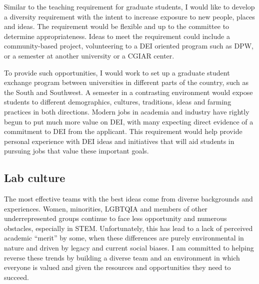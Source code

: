 \documentclass[11pt]{article}
\newcommand{\nicholas}[1]{{\color{nicholasCol} [\textbf{NS:} #1 (\today\ \currenttime)]}}
\begin{document}
Similar to the teaching requirement for graduate students, I would like to develop a diversity requirement with the intent to increase exposure to new people, places and ideas. The requirement would be flexible and up to the committee to determine appropriateness. Ideas to meet the requirement could include a community-based project, volunteering to a DEI oriented program such as DPW, or a semester at another university or a CGIAR center. %

To provide such opportunities, I would work to set up a graduate student exchange program between universities in different parts of the country, such as the South and Southwest. A semester in a contrasting environment would expose students to different demographics, cultures, traditions, ideas and farming practices in both directions. Modern jobs in academia and industry have rightly begun to put much more value on DEI, with many expecting direct evidence of a commitment to DEI from the applicant. This requirement would help provide personal experience with DEI ideas and initiatives that will aid students in pursuing jobs that value these important goals.%





\subsection*{Lab culture}




The most effective teams with the best ideas come from diverse backgrounds and experiences. Women, minorities, LGBTQIA and members of other underrepresented groups continue to face less opportunity and numerous obstacles, especially in STEM. Unfortunately, this has lead to a lack of perceived academic ``merit'' by some, when these differences are purely environmental in nature and driven by legacy and current social biases. I am committed to helping reverse these trends by building a diverse team and an environment in which everyone is valued and given the resources and opportunities they need to succeed. 
\end{document}
